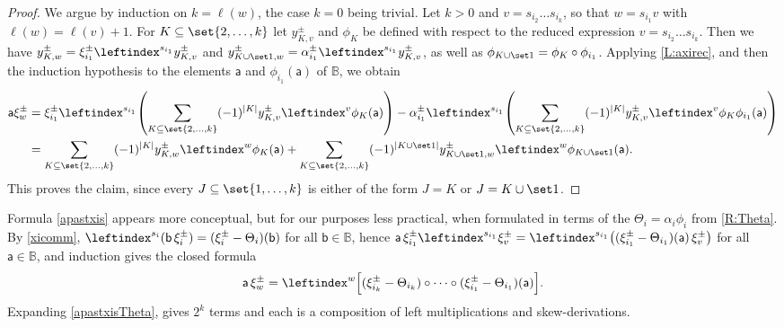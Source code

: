 \documentclass[a4paper,11pt]{amsart}
\numberwithin{equation}{subsection}
\theoremstyle{definition}
\theoremstyle{theorem}
\theoremstyle{remark}
\newcommand\xipm{\xi^\pm}
\newcommand\ba{\mathsf{a}}
\newcommand\bb{\mathsf{b}}
\newcommand{\Bo}{\mathbb{B}}
\begin{document}
  \begin{proof}
   We argue by induction on $k=\ell(w)$, the case $k=0$ being trivial. Let $k>0$
   and $v=s_{i_2}\dots s_{i_k}$, so that $w=s_{i_1}v$ with $\ell(w)=\ell(v)+1$. For $K\subseteq\set{2,\dots,k}$ let $y^\pm_{K,v}$ and
   $\phi_K$ be defined with respect to the reduced expression $v=s_{i_2}\dots s_{i_k}$. Then
   we have $y^\pm_{K,w}=\xipm_{i_1}\leftindex^{s_{i_1}}{{y^\pm_{K,v}}}$ and
   $y^\pm_{K\cup\set1,w}=\alpha^\pm_{i_1}\leftindex^{s_{i_1}}{{y^\pm_{K,v}}}$, as well as
   $\phi_{K\cup\set1}=\phi_K\circ\phi_{i_1}$.
   Applying \autoref{L:axirec}, and then the induction hypothesis to the elements $\ba$ and $\phi_{i_1}(\ba)$ of $\Bo$, we obtain
   \begin{align*}
     \ba\xipm_w
       &=\xipm_{i_1}\leftindex^{s_{i_1}}{\left(\sum_{K\subseteq\set{2,\dots,k}}(-1)^{|K|}y^\pm_{K,v}\leftindex^v{{\phi_K(\ba)}}\right)}
         -\alpha^\pm_{i_1}\leftindex^{s_{i_1}}{\left(\sum_{K\subseteq\set{2,\dots,k}}(-1)^{|K|}y^\pm_{K,v}\leftindex^v{{\phi_K\phi_{i_1}(\ba)}}\right)}\\
       &=\sum_{K\subseteq\set{2,\dots,k}}(-1)^{|K|}y^\pm_{K,w}\leftindex^w{{\phi_K(\ba)}}
         +\sum_{K\subseteq\set{2,\dots,k}}(-1)^{|K\cup\set1|}y^\pm_{K\cup\set1,w}\leftindex^w{{\phi_{K\cup\set1}(\ba)}}.
   \end{align*}
   This proves the claim, since every $J\subseteq\set{1,\dots,k}$ is either of the form $J=K$ or $J=K\cup\set1$.
 \end{proof}

 \begin{Remark}\label{R:closed}  Formula \autoref{apastxis} appears more conceptual, but for our purposes less practical, when formulated in terms of the $\Theta_i=\alpha_i\phi_i$ from \autoref{R:Theta}. By \autoref{xicomm}, $\leftindex^{s_i}{(\bb\,\xipm_i)}=(\xipm_i-\Theta_i)(\bb)$ for all $\bb\in\Bo$, hence $\ba\,\xipm_{i_1}\leftindex^{s_{i_1}}{{\xipm_v}}
   =\leftindex^{s_{i_1}}{\left((\xipm_{i_1}-\Theta_{i_1})(\ba)\,\xipm_v\right)}$ for all $\ba\in\Bo$, and induction gives the closed formula
  \begin{equation}\label{apastxisTheta}
    \ba\,\xipm_w=\leftindex^w{\Bigl[(\xipm_{i_k}-\Theta_{i_k})\circ\dots\circ(\xipm_{i_1}-\Theta_{i_1})(\ba)\Bigr]}.
  \end{equation}
  Expanding \autoref{apastxisTheta}, gives $2^k$ terms and each is a composition of left multiplications and skew-derivations. \end{Remark}
\end{document}
